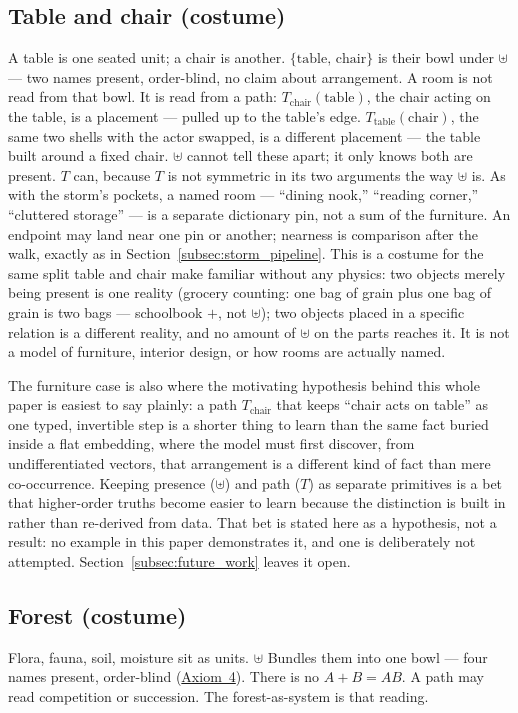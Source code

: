 \documentclass[12pt, a4paper]{article}
\begin{document}
\subsection{Table and chair (costume)}
\label{subsec:table_chair}
A table is one seated unit; a chair is another. $\{\mathrm{table},\,\mathrm{chair}\}$
is their bowl under $\uplus$ --- two names present, order-blind, no
claim about arrangement. A room is not read from that bowl. It is
read from a path: $T_{\mathrm{chair}}(\mathrm{table})$, the chair
acting on the table, is a placement --- pulled up to the table's edge.
$T_{\mathrm{table}}(\mathrm{chair})$, the same two shells with the
actor swapped, is a different placement --- the table built around
a fixed chair. $\uplus$ cannot tell these apart; it only knows both
are present. $T$ can, because $T$ is not symmetric in its two
arguments the way $\uplus$ is. As with the storm's pockets, a named
room --- ``dining nook,'' ``reading corner,'' ``cluttered storage''
--- is a separate dictionary pin, not a sum of the furniture. An
endpoint may land near one pin or another; nearness is comparison
after the walk, exactly as in Section~\ref{subsec:storm_pipeline}.
This is a costume for the same split table and chair make familiar
without any physics: two objects merely being present is one
reality (grocery counting: one bag of grain plus one bag of grain is
two bags --- schoolbook $+$, not $\uplus$); two objects placed
in a specific relation is a different reality, and no amount of
$\uplus$ on the parts reaches it. It is not a model of furniture,
interior design, or how rooms are actually named.

The furniture case is also where the motivating hypothesis behind
this whole paper is easiest to say plainly: a path $T_{\mathrm{chair}}$
that keeps ``chair acts on table'' as one typed, invertible step is a
shorter thing to learn than the same fact buried inside a flat
embedding, where the model must first discover, from undifferentiated
vectors, that arrangement is a different kind of fact than mere
co-occurrence. Keeping presence ($\uplus$) and path ($T$) as separate
primitives is a bet that higher-order truths become easier to learn
because the distinction is built in rather than re-derived from data.
That bet is stated here as a hypothesis, not a result: no example in
this paper demonstrates it, and one is deliberately not attempted.
Section~\ref{subsec:future_work} leaves it open.

\subsection{Forest (costume)}
Flora, fauna, soil, moisture sit as units. $\uplus$ Bundles them into
one bowl --- four names present, order-blind
(\hyperref[subsec:axiom_idempotence]{Axiom~4}).
There is no $A+B=AB$. A path may read competition or succession.
The forest-as-system is that reading.
\end{document}
